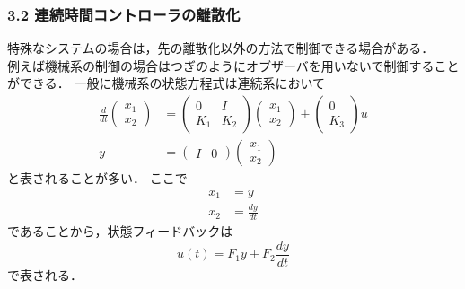 \begin{frame}[t]
\frametitle{3.2 連続時間コントローラの離散化}
特殊なシステムの場合は，先の離散化以外の方法で制御できる場合がある．\\
例えば機械系の制御の場合はつぎのようにオブザーバを用いないで制御することができる．
一般に機械系の状態方程式は連続系において
\begin{align}
 \frac{d}{dt}
  \left(\begin{array}{c}
         x_1 \\
	 x_2 
	\end{array}\right)
  &=
  \left(\begin{array}{cc}
         0   & I \\
	 K_1 & K_2
	\end{array}\right)
  \left(\begin{array}{c}
         x_1 \\
	 x_2 
	\end{array}\right)
  +
  \left(\begin{array}{c}
         0 \\
	 K_3
	\end{array}\right)
  u \\
 y &=
  \left(\begin{array}{cc}
         I & 0 
	\end{array}\right)
  \left(\begin{array}{c}
         x_1 \\
	 x_2 
	\end{array}\right)
\end{align}
と表されることが多い．
ここで
\begin{align}
 x_1 &= y \\
 x_2 &= \frac{dy}{dt}
\end{align}
であることから，状態フィードバックは
\begin{equation}
 u(t) = F_1 y + F_2 \frac{dy}{dt}
\end{equation}
で表される．
\end{frame}

